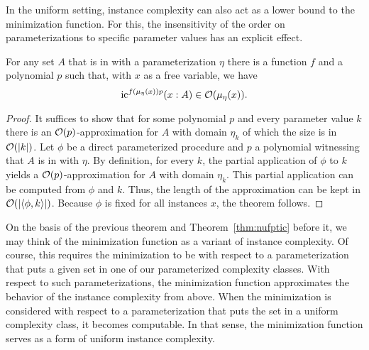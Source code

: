 In the uniform setting, instance complexity can also act as a lower bound to the minimization function.
For this, the insensitivity of the order on parameterizations to specific parameter values has an explicit effect.
\begin{theorem}
\label{thm:fptic}
  For any set $A$ that is in  with a parameterization $\eta$ there is a function $f$ and a polynomial $p$ such that, with $x$ as a free variable, we have
  \begin{equation*}
    \operatorname{ic}^{f(\mu_\eta(x))p}(x : A) \in \operatorname{\mathcal{O}}(\mu_\eta(x)).
  \end{equation*}
\end{theorem}
\begin{proof}
  It suffices to show that for some polynomial $p$ and every parameter value $k$ there is an $\operatorname{\mathcal{O}}(p)$-approximation for $A$ with domain $\eta_k$ of which the size is in $\operatorname{\mathcal{O}}({\lvert k\rvert})$.
  Let $\phi$ be a direct parameterized procedure and $p$ a polynomial witnessing that $A$ is in  with $\eta$.
  By definition, for every $k$, the partial application of $\phi$ to $k$ yields a $\operatorname{\mathcal{O}}(p)$-approximation for $A$ with domain $\eta_k$.
  This partial application can be computed from $\phi$ and $k$.
  Thus, the length of the approximation can be kept in $\operatorname{\mathcal{O}}({\lvert{\langle \phi, k\rangle}\rvert})$.
  Because $\phi$ is fixed for all instances $x$, the theorem follows.
\end{proof}

On the basis of the previous theorem and Theorem~\ref{thm:nufptic} before it, we may think of the minimization function as a variant of instance complexity.
Of course, this requires the minimization to be with respect to a parameterization that puts a given set in one of our parameterized complexity classes.
With respect to such parameterizations, the minimization function approximates the behavior of the instance complexity from above.
When the minimization is considered with respect to a parameterization that puts the set in a uniform complexity class, it becomes computable.
In that sense, the minimization function serves as a form of uniform instance complexity.


